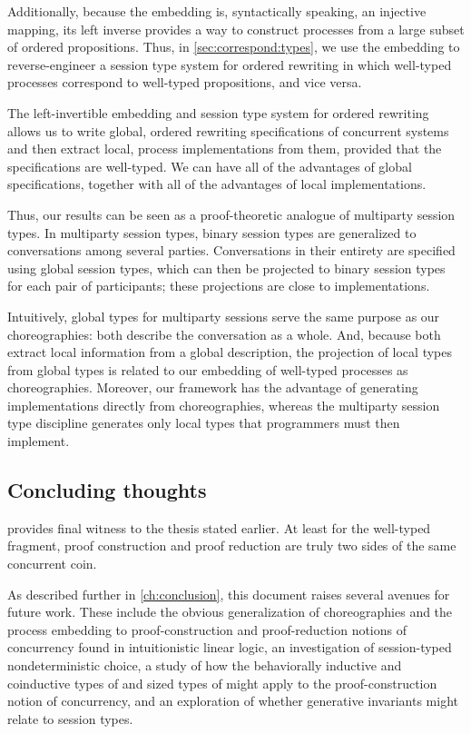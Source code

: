 Additionally, because the embedding is, syntactically speaking, an injective mapping, its left inverse provides a way to construct processes from a large subset of ordered propositions.
Thus, in \cref{sec:correspond:types}, we use the embedding to reverse-engineer a session type system for ordered rewriting in which well-typed processes correspond to well-typed propositions, and vice versa.

The left-invertible embedding and session type system for ordered rewriting allows us to write global, ordered rewriting specifications of concurrent systems and then extract local, process implementations from them, provided that the specifications are well-typed.
We can have all of the advantages of global specifications, together with all of the advantages of local implementations.

Thus, our results can be seen as a proof-theoretic analogue of multiparty session types.\autocite{Honda+:POPL08}
In multiparty session types, binary session types are generalized to conversations among several parties.
Conversations in their entirety are specified using global session types, which can then be projected to binary session types for each pair of participants; these projections are close to implementations.

Intuitively, global types for multiparty sessions serve the same purpose as our choreographies: both describe the conversation as a whole.
And, because both extract local information from a global description, the projection of local types from global types is related to our embedding of well-typed processes as choreographies.
Moreover, our framework has the advantage of generating implementations directly from choreographies, whereas the multiparty session type discipline generates only local types that programmers must then implement.

\subsection{Concluding thoughts}

 provides final witness to the thesis stated earlier.
At least for the well-typed fragment, proof construction and proof reduction are truly two sides of the same concurrent coin.

As described further in \cref{ch:conclusion}, this document raises several avenues for future work.
These include the obvious generalization of choreographies and the process embedding to proof-construction and proof-reduction notions of concurrency found in intuitionistic linear logic, an investigation of session-typed nondeterministic choice, a study of how the behaviorally inductive and coinductive types of  and sized types of  might apply to the proof-construction notion of concurrency, and an exploration of whether generative invariants\autocite{Simmons:CMU12} might relate to session types.

